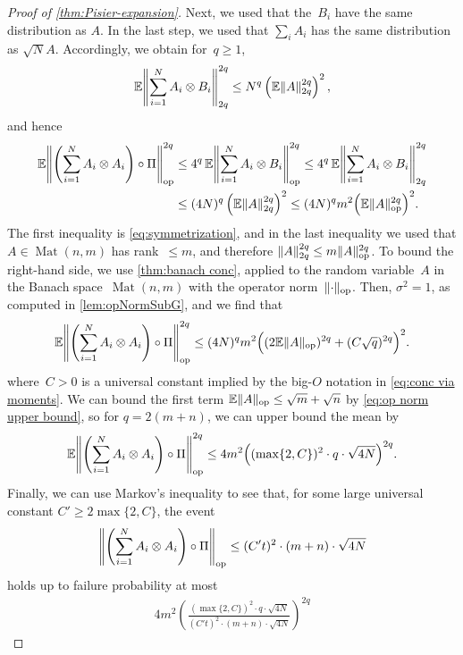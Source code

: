 \documentclass[aos]{imsart}
\theoremstyle{definition}
\numberwithin{equation}{section}
\DeclareMathOperator{\op}{op}
\DeclareMathOperator{\Mat}{Mat}
\DeclarePairedDelimiter{\norm}{\lVert}{\rVert}
\newcommand{\ot}{\otimes}
\newcommand{\E}{\mathbb{E}}
\begin{document}
\begin{appendix}
\begin{proof} [Proof of \cref{thm:Pisier-expansion}]
Next, we used that the~$B_i$ have the same distribution as $A$.
In the last step, we used that $\sum_i A_i$ has the same distribution as $\sqrt N A$.
Accordingly, we obtain for~$q\geq1$,
\begin{align*}
  \E \norm*{\sum_{i=1}^N A_i \ot B_i}_{2q}^{2q}
\leq N^q \left( \E\norm{A}_{2q}^{2q} \right)^2,
\end{align*}
and hence
\begin{align*}
\E \norm*{\left( \sum_{i=1}^N A_i \otimes A_i \right) \circ \Pi}_{\op}^{2q}
&\leq 4^q \, \E \norm*{\sum_{i=1}^N A_i \ot B_i}_{\op}^{2q}
\leq 4^q \, \E \norm*{\sum_{i=1}^N A_i \ot B_i}_{2q}^{2q} \\
&\leq (4N)^q \left( \E\norm{A}_{2q}^{2q} \right)^2
\leq (4N)^q m^2 \Bigl( \E\norm{A}_{\op}^{2q} \Bigr)^2.
\end{align*}
The first inequality is \cref{eq:symmetrization}, and in the last inequality we used that $A \in \Mat(n,m)$ has rank~$\leq m$, and therefore $\norm{A}_{2q}^{2q} \leq m \norm A_{\op}^{2q}$.
To bound the right-hand side, we use \cref{thm:banach conc}, applied to the random variable~$A$ in the Banach space~$\Mat(n,m)$ with the operator norm~$\norm{\cdot}_{\op}$.
Then, $\sigma^2=1$, as computed in \cref{lem:opNormSubG}, and we find that
\begin{align*}
\E \norm*{\left( \sum_{i=1}^N A_i \otimes A_i \right) \circ \Pi}_{\op}^{2q}
\leq (4 N)^q m^2 \Bigl( (2 \E\norm A_{\op})^{2q} + (C \sqrt{q})^{2q} \Bigr)^{2}.
\end{align*}
where~$C>0$ is a universal constant implied by the big-$O$ notation in \cref{eq:conc via moments}. 
We can bound the first term $\E \norm{A}_{\op} \leq \sqrt{m}+\sqrt{n}$ by \cref{eq:op norm upper bound}, so for $q = 2(m + n)$, we can upper bound the mean by
\begin{align*}
\E \norm*{\left( \sum_{i=1}^N A_i \otimes A_i \right) \circ \Pi}_{\op}^{2q}
\leq 4 m^2 \Big( (\max\{2, C\})^{2} \cdot q \cdot \sqrt{ 4 N }\Big)^{2q} .
\end{align*}
Finally, we can use Markov's inequality to see that, for some large universal constant $C' \geq 2 \max\{2, C \}$, the event
\begin{align}\label{eq:desired event}
  \norm*{\left(\sum_{i=1}^N A_i \otimes A_i \right) \circ \Pi}_{\op}
  \leq (C' t)^2 \cdot (m+n) \cdot \sqrt{4 N} 
\end{align}
holds up to failure probability at most
\begin{align*}
  4 m^2 \left( \frac{(\max\{2, C\})^{2} \cdot q \cdot \sqrt{ 4 N } }{(C' t)^2 \cdot (m+n) \cdot \sqrt{4 N}} \right)^{2q}

\end{align*}
\end{proof}
\end{appendix}
\end{document}
